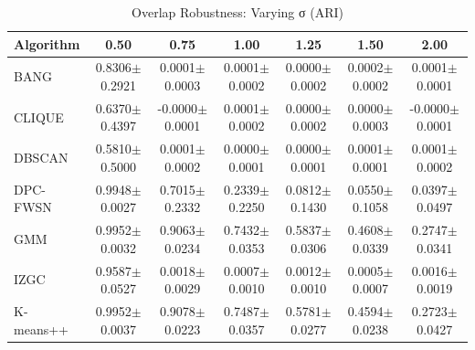 \begin{table}[ht!]
\centering
\caption{Overlap Robustness: Varying σ (ARI)}
\label{tab:overlap_vary_sigma}
\begin{tabular*}{\linewidth}{@{} lcccccc @{}}
\toprule
Algorithm & 0.50 & 0.75 & 1.00 & 1.25 & 1.50 & 2.00 \\
\midrule
BANG & 0.8306$\pm$0.2921 & 0.0001$\pm$0.0003 & 0.0001$\pm$0.0002 & 0.0000$\pm$0.0002 & 0.0002$\pm$0.0002 & 0.0001$\pm$0.0001 \\
CLIQUE & 0.6370$\pm$0.4397 & -0.0000$\pm$0.0001 & 0.0001$\pm$0.0002 & 0.0000$\pm$0.0002 & 0.0000$\pm$0.0003 & -0.0000$\pm$0.0001 \\
DBSCAN & 0.5810$\pm$0.5000 & 0.0001$\pm$0.0002 & 0.0000$\pm$0.0001 & 0.0000$\pm$0.0001 & 0.0001$\pm$0.0001 & 0.0001$\pm$0.0002 \\
DPC-FWSN & 0.9948$\pm$0.0027 & 0.7015$\pm$0.2332 & 0.2339$\pm$0.2250 & 0.0812$\pm$0.1430 & 0.0550$\pm$0.1058 & 0.0397$\pm$0.0497 \\
GMM & 0.9952$\pm$0.0032 & 0.9063$\pm$0.0234 & 0.7432$\pm$0.0353 & 0.5837$\pm$0.0306 & 0.4608$\pm$0.0339 & 0.2747$\pm$0.0341 \\
IZGC & 0.9587$\pm$0.0527 & 0.0018$\pm$0.0029 & 0.0007$\pm$0.0010 & 0.0012$\pm$0.0010 & 0.0005$\pm$0.0007 & 0.0016$\pm$0.0019 \\
K-means++ & 0.9952$\pm$0.0037 & 0.9078$\pm$0.0223 & 0.7487$\pm$0.0357 & 0.5781$\pm$0.0277 & 0.4594$\pm$0.0238 & 0.2723$\pm$0.0427 \\
\bottomrule
\end{tabular*}
\end{table}